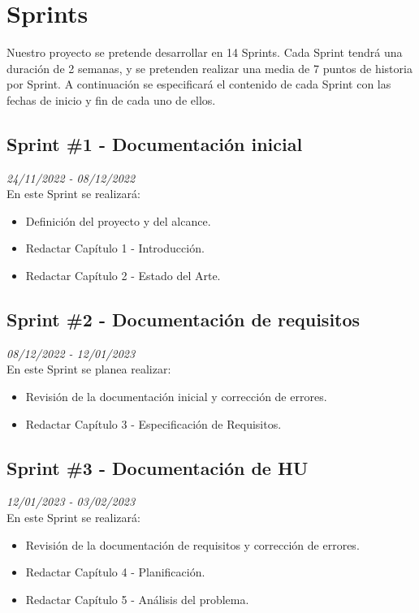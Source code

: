 \section{Sprints}
Nuestro proyecto se pretende desarrollar en 14 Sprints. Cada Sprint tendrá una duración de 2 semanas, y se pretenden realizar una media
de 7 puntos de historia por Sprint. A continuación se especificará el contenido de cada Sprint con las fechas de inicio y fin de cada uno de ellos.

\subsection{Sprint \#1 - Documentación inicial}
\textit{24/11/2022   -   08/12/2022}\\

En este Sprint se realizará:
\begin{itemize}

    \item Definición del proyecto y del alcance.
    \item Redactar Capítulo 1 - Introducción.
    \item Redactar Capítulo 2 - Estado del Arte.
\end{itemize}
\subsection{Sprint \#2 - Documentación de requisitos}
\textit{08/12/2022   -   12/01/2023}\\

En este Sprint se planea realizar:
\begin{itemize}
    \item Revisión de la documentación inicial y corrección de errores.
    \item Redactar Capítulo 3 - Especificación de Requisitos.
\end{itemize}

\newpage

\subsection{Sprint \#3 - Documentación de HU}
\textit{12/01/2023   -   03/02/2023}\\

En este Sprint se realizará:
\begin{itemize}
    \item Revisión de la documentación de requisitos y corrección de errores.
    \item Redactar Capítulo 4 - Planificación.
    \item Redactar Capítulo 5 - Análisis del problema.
\end{itemize}
